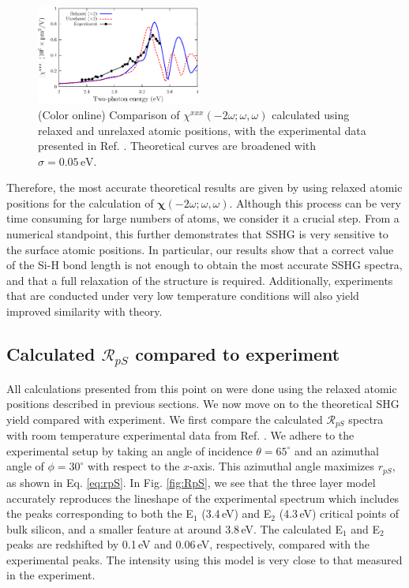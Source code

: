 \begin{figure}[t]
\centering
\includegraphics[width=0.48\textwidth]{figures/03-results/shgyield/fig2}
\caption{(Color online) Comparison of $\chi^{xxx}(-2\omega;\omega,\omega)$
calculated using relaxed and unrelaxed atomic positions, with the experimental
data presented in Ref. \cite{hoferAPA96}. Theoretical curves are broadened
with $\sigma=0.05\,\text{eV}$.\label{fig:Xxxx}}
\end{figure}

Therefore, the most accurate theoretical results are given by using relaxed
atomic positions for the calculation of
$\boldsymbol{\chi}(-2\omega;\omega,\omega)$. Although this process can be very
time consuming for large numbers of atoms, we consider it a crucial step. From a
numerical standpoint, this further demonstrates that SSHG is very sensitive to
the surface atomic positions. In particular, our results show that a correct
value of the Si-H bond length is not enough to obtain the most accurate SSHG
spectra, and that a full relaxation of the structure is required. Additionally,
experiments that are conducted under very low temperature conditions will also
yield improved similarity with theory.


\subsection{Calculated \texorpdfstring{$\mathcal{R}_{pS}$}{RpS} compared to
experiment}\label{sec:RpS}

All calculations presented from this point on were done using the relaxed atomic
positions described in previous sections. We now move on to the theoretical SHG
yield compared with experiment. We first compare the calculated
$\mathcal{R}_{pS}$ spectra with room temperature experimental data from Ref.
\cite{mejiaPRB02}. We adhere to the experimental setup by taking an angle
of incidence $\theta=65^{\circ}$ and an azimuthal angle of $\phi=30^\circ$ with
respect to the $x$-axis. This azimuthal angle maximizes $r_{pS}$, as shown in
Eq. \eqref{eq:rpS}. In Fig. \ref{fig:RpS}, we see that the three layer model
accurately reproduces the lineshape of the experimental spectrum which includes
the peaks corresponding to both the E$_{1}$ (3.4\,eV) and E$_{2}$ (4.3\,eV)
critical points of bulk silicon, and a smaller feature at around 3.8\,eV. The
calculated E$_{1}$ and E$_{2}$ peaks are redshifted by 0.1\,eV and 0.06\,eV,
respectively, compared with the experimental peaks. The intensity using this
model is very close to that measured in the experiment. 

